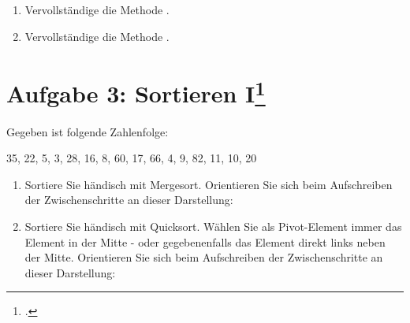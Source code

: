 \documentclass{lehramt-informatik-haupt}
\begin{document}
\begin{enumerate}


\item Vervollständige die Methode .

\begin{antwort}
\end{antwort}


\item Vervollständige die Methode .

\begin{antwort}
\end{antwort}
\end{enumerate}

%

\section{Aufgabe 3: Sortieren I\footcite[entnommen aus Algorithmen und
Datenstrukturen, Übungsblatt 2, Universität Würzburg]{aud:pu:7}}

Gegeben ist folgende Zahlenfolge:

35, 22, 5, 3, 28, 16, 8, 60, 17, 66, 4, 9, 82, 11, 10, 20

\begin{enumerate}
\item Sortiere Sie händisch mit Mergesort. Orientieren Sie sich beim
Aufschreiben der Zwischenschritte an dieser Darstellung:

\item Sortiere Sie händisch mit Quicksort. Wählen Sie als Pivot-Element
immer das Element in der Mitte - oder gegebenenfalls das Element direkt
links neben der Mitte. Orientieren Sie sich beim Aufschreiben der
Zwischenschritte an dieser Darstellung:

\end{enumerate}

\literatur
\end{document}
